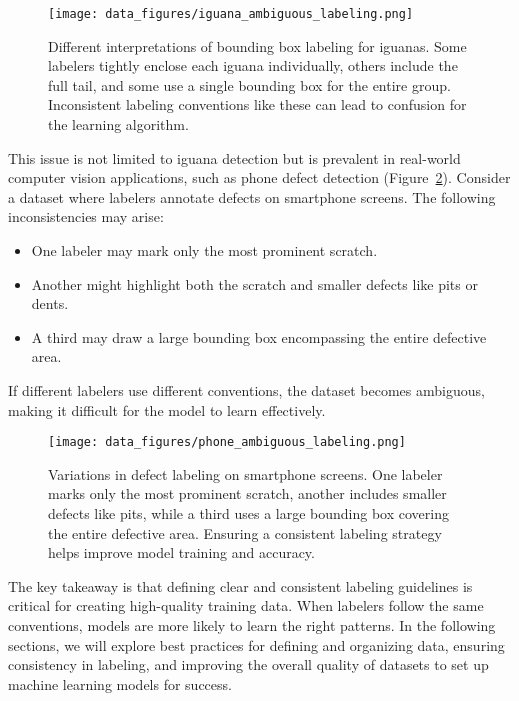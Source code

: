 \documentclass[12pt,openany, draft]{book}
\begin{document}
\begin{figure}[H]
    \centering
    \texttt{[image: data\_figures/iguana\_ambiguous\_labeling.png]}
    \caption{Different interpretations of bounding box labeling for iguanas. Some labelers tightly enclose each iguana individually, others include the full tail, and some use a single bounding box for the entire group. Inconsistent labeling conventions like these can lead to confusion for the learning algorithm.}
    \label{fig:iguana_ambiguous_labeling}
\end{figure}

This issue is not limited to iguana detection but is prevalent in real-world computer vision applications, such as phone defect detection (Figure~\ref{fig:phone_ambiguous_labeling}). Consider a dataset where labelers annotate defects on smartphone screens. The following inconsistencies may arise:
\begin{itemize}
    \item One labeler may mark only the most prominent scratch.
    \item Another might highlight both the scratch and smaller defects like pits or dents.
    \item A third may draw a large bounding box encompassing the entire defective area.
\end{itemize}
If different labelers use different conventions, the dataset becomes ambiguous, making it difficult for the model to learn effectively.

\begin{figure}[H]
    \centering
    \texttt{[image: data\_figures/phone\_ambiguous\_labeling.png]}
    \caption{Variations in defect labeling on smartphone screens. One labeler marks only the most prominent scratch, another includes smaller defects like pits, while a third uses a large bounding box covering the entire defective area. Ensuring a consistent labeling strategy helps improve model training and accuracy.}
    \label{fig:phone_ambiguous_labeling}
\end{figure}

The key takeaway is that defining clear and consistent labeling guidelines is critical for creating high-quality training data. When labelers follow the same conventions, models are more likely to learn the right patterns. In the following sections, we will explore best practices for defining and organizing data, ensuring consistency in labeling, and improving the overall quality of datasets to set up machine learning models for success.
\end{document}
